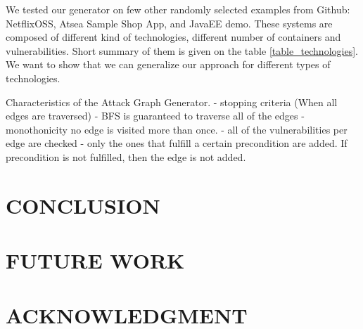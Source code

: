 \documentclass[letterpaper, 10 pt, conference]{ieeeconf}  %
\begin{document}
 We tested our generator on few other randomly selected examples from Github: NetflixOSS, Atsea Sample Shop App, and JavaEE demo. These systems are composed of different kind of technologies, different number of containers and vulnerabilities. Short summary of them is given on the table \ref{table_technologies}. We want to show that we can generalize our approach for different types of technologies. 
 
Characteristics of the Attack Graph Generator.
 - stopping criteria (When all edges are traversed)
 - BFS is guaranteed to traverse all of the edges 
 - monothonicity no edge is visited more than once.
 - all of the vulnerabilities per edge are checked
 - only the ones that fulfill a certain precondition are added. If precondition is not fulfilled, then the edge is not added.






\section{CONCLUSION}

\section{FUTURE WORK}


\addtolength{\textheight}{-12cm}   %








\section*{ACKNOWLEDGMENT}
\end{document}

